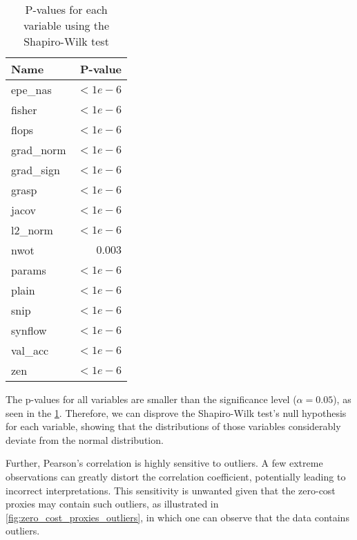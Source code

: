 \begin{table}[h]
\caption{P-values for each variable using the Shapiro-Wilk test}
\centering
\begin{tabular}{lr}
\textbf{Name} & \textbf{P-value} \\ \hline
\multicolumn{1}{l|}{\cellcolor{verylightgray}epe\_nas} & \cellcolor{verylightgray}$<1e-6$ \\
\multicolumn{1}{l|}{fisher} & $< 1e-6$ \\
\multicolumn{1}{l|}{\cellcolor{verylightgray}flops} & \cellcolor{verylightgray} $< 1e-6$ \\
\multicolumn{1}{l|}{grad\_norm} & $< 1e-6$ \\
\multicolumn{1}{l|}{\cellcolor{verylightgray}grad\_sign} & \cellcolor{verylightgray}$< 1e-6$ \\
\multicolumn{1}{l|}{grasp} & $< 1e-6$ \\
\multicolumn{1}{l|}{\cellcolor{verylightgray}jacov} & \cellcolor{verylightgray}$< 1e-6$ \\
\multicolumn{1}{l|}{l2\_norm} & $< 1e-6$ \\
\multicolumn{1}{l|}{\cellcolor{verylightgray}nwot} & \cellcolor{verylightgray}$0.003$ \\
\multicolumn{1}{l|}{params} & $< 1e-6$ \\
\multicolumn{1}{l|}{\cellcolor{verylightgray}plain} & \cellcolor{verylightgray} $< 1e-6$ \\
\multicolumn{1}{l|}{snip} & $< 1e-6$ \\
\multicolumn{1}{l|}{\cellcolor{verylightgray}synflow} & \cellcolor{verylightgray}$< 1e-6$ \\
\multicolumn{1}{l|}{val\_acc} & $< 1e-6$ \\
\multicolumn{1}{l|}{zen} & $< 1e-6$ \\
\end{tabular}
\label{tab:p_values}
\end{table}

The p-values for all variables are smaller than the significance level ($\alpha = 0.05$), as seen in the \cref{tab:p_values}. Therefore, we can disprove the Shapiro-Wilk test's null hypothesis for each variable, showing that the distributions of those variables considerably deviate from the normal distribution.

Further, Pearson's correlation is highly sensitive to outliers. A few extreme observations can greatly distort the correlation coefficient, potentially leading to incorrect interpretations. This sensitivity is unwanted given that the zero-cost proxies may contain such outliers, as illustrated in \cref{fig:zero_cost_proxies_outliers}, in which one can observe that the data contains outliers. 

